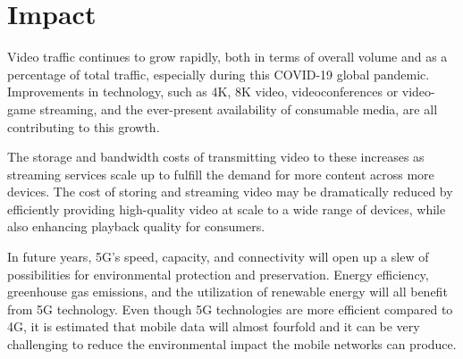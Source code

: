 \chapter{Impact} \label{chap:impact}



Video traffic continues to grow rapidly, both in terms of overall volume 
and as a percentage of total traffic, especially during this COVID-19
global pandemic. 
Improvements in technology, such as 
4K, 8K video, videoconferences or video-game streaming, and the ever-present 
availability of consumable media, are all contributing to this growth.

The storage and bandwidth costs of transmitting video to these 
increases as streaming services scale up to fulfill the demand for more 
content across more devices. The cost of storing and streaming video may 
be dramatically reduced by 
efficiently providing high-quality video at scale to a wide range of devices, 
while also enhancing playback quality for consumers.

In future years, 5G's speed, capacity, and connectivity will open up a slew of 
possibilities for environmental protection and preservation. Energy efficiency, 
greenhouse gas emissions, and the utilization of renewable energy will all benefit from 
5G technology. Even though 5G technologies are more efficient 
compared to 4G, it is estimated that mobile data will almost fourfold\cite{gsm1} and 
it can be very challenging to reduce the environmental impact the mobile networks
can produce.